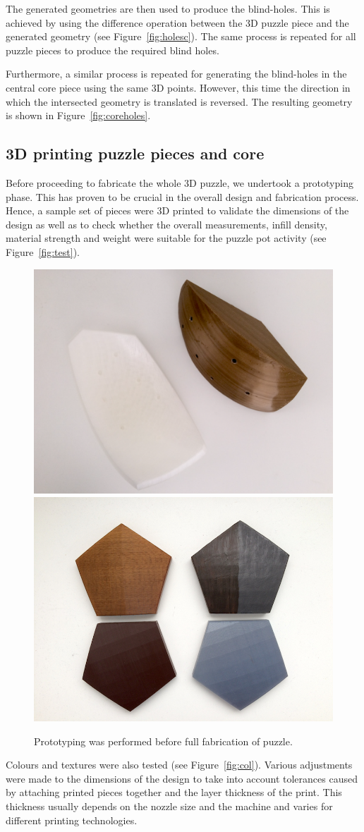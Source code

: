 \documentclass[acmlarge,screen,dvipsnames]{acmart}
\begin{document}
The generated geometries are then used to produce the
blind-holes. This is achieved by using the difference operation
between the 3D puzzle piece and the generated geometry (see
Figure~\ref{fig:holesc}). The same process is repeated for all puzzle
pieces to produce the required blind holes.

Furthermore, a similar process is repeated for generating the
blind-holes in the central core piece using the same 3D
points. However, this time the direction in which the intersected
geometry is translated is reversed. The resulting geometry is shown in
Figure~\ref{fig:coreholes}.

\subsection{3D printing puzzle pieces and core}

Before proceeding to fabricate the whole 3D puzzle, we undertook a
prototyping phase. This has proven to be crucial in the overall design
and fabrication process. Hence, a sample set of pieces were 3D printed
to validate the dimensions of the design as well as to check whether
the overall measurements, infill density, material strength and weight
were suitable for the puzzle pot activity (see Figure~\ref{fig:test}).
%
\begin{figure}[htb]
  \centering
  {\includegraphics[width=0.445\linewidth]{images/coreANDpiece}}
   {\includegraphics[width=0.446\linewidth]{images/colour}}

  \caption{%
    Prototyping was performed before full fabrication of puzzle.}
\end{figure}
%
Colours and textures were also tested (see
Figure~\ref{fig:col}). Various adjustments were made to the dimensions
of the design to take into account tolerances caused by attaching
printed pieces together and the layer thickness of the print. This
thickness usually depends on the nozzle size and the machine and
varies for different printing technologies.
\end{document}
